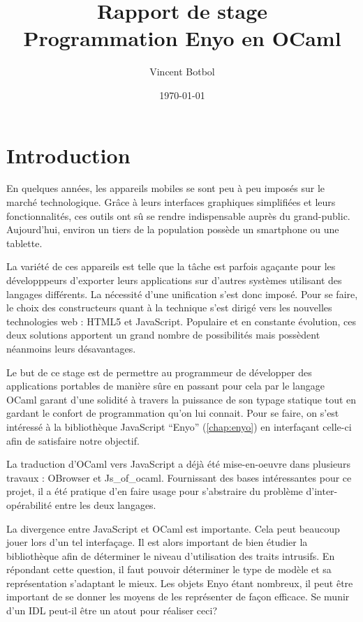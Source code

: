 \documentclass[11pt,a4paper]{report}
\title{Rapport de stage\\Programmation Enyo en OCaml}
\author{Vincent Botbol}
\date\today
\begin{document}
\maketitle

\chapter{Introduction}

En quelques années, les appareils mobiles se sont peu à peu imposés sur le marché technologique.
Grâce à leurs interfaces graphiques simplifiées et leurs fonctionnalités, ces outils ont sû se 
rendre indispensable auprès du grand-public.
Aujourd'hui, environ un tiers de la population possède un smartphone ou une tablette.

La variété de ces appareils est telle que la tâche est parfois agaçante pour les développpeurs 
d'exporter leurs applications sur d'autres systèmes utilisant des langages différents.
La nécessité d'une unification s'est donc imposé. Pour se faire, le choix des constructeurs quant à
la technique s'est dirigé vers les nouvelles technologies web :
HTML5 et JavaScript. Populaire et en constante évolution, ces deux solutions apportent un grand nombre
de possibilités mais possèdent néanmoins leurs désavantages.

Le but de ce stage est de permettre au programmeur de développer des applications portables de manière sûre
en passant pour cela par le langage OCaml garant d'une solidité à travers la puissance de son typage statique
tout en gardant le confort de programmation qu'on lui connait.
Pour se faire, on s'est intéressé à la bibliothèque JavaScript ``Enyo'' (\ref{chap:enyo}) 
en interfaçant celle-ci afin de satisfaire notre objectif.

La traduction d'OCaml vers JavaScript a déjà été mise-en-oeuvre dans plusieurs travaux : OBrowser
et Js\_of\_ocaml. Fournissant des bases intéressantes pour ce projet, il a été pratique d'en faire usage
pour s'abstraire du problème d'inter-opérabilité entre les deux langages.

La divergence entre JavaScript et OCaml est importante. Cela peut beaucoup jouer lors d'un tel 
interfaçage. Il est alors important de bien étudier la bibliothèque afin de déterminer le niveau
d'utilisation des traits intrusifs.
En répondant cette question, il faut pouvoir déterminer le type de modèle et sa représentation
s'adaptant le mieux.
Les objets Enyo étant nombreux, il peut être important de se donner les moyens de les représenter 
de façon efficace. Se munir d'un IDL peut-il être un atout pour réaliser ceci?
\end{document}
